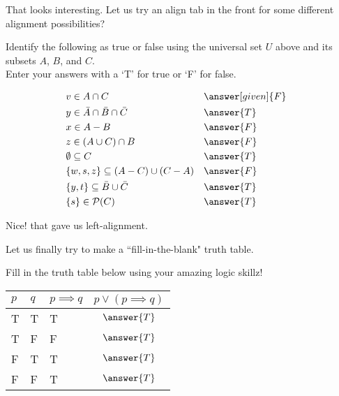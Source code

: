 \documentclass{ximera}
\begin{document}
That looks interesting. Let us try an align tab in the front for some different alignment possibilities?

\begin{question}
Identify the following as true or false using the universal set $U$ above and its subsets $A$, $B$, and $C$. \\ Enter your answers with a `T' for true or `F' for false.
\begin{prompt}

    \begin{align*}
        &v \in A \cap C && \answer[given]{F}  \\
        &y \in \bar{A} \cap \bar{B} \cap \bar{C} && \answer{T} \\		
        &x \in A - B && \answer{F}  \\		
        &z \in (A \cup C) \cap B && \answer{F} \\	
        &\emptyset \subseteq C && \answer{T} \\	
        &\{w, s, z\} \subseteq (A - C) \cup (C - A) && \answer{F}&\\
        &\{y,t\} \subseteq \bar{B} \cup \bar{C} && \answer{T} \\			
        &\{s\} \in \mathcal{P}(C) && \answer{T} 
    \end{align*}

\end{prompt}
\end{question}

Nice! that gave us left-alignment. 

Let us finally try to make a ``fill-in-the-blank" truth table.

\begin{problem}
Fill in the truth table below using your amazing logic skillz!

\begin{prompt}
\begin{center}
\begin{tabular}{p{30pt} | p{30pt} | p{60pt} | c }
		$p$ & $q$ & $p \implies q$ & $p \vee (p \implies q)$ \\
		\hline
		T & T & T & $\answer{T}$ \\
		T & F & F & $\answer{T}$ \\
		F & T & T & $\answer{T}$\\
		F & F & T & $\answer{T}$
	\end{tabular}
\end{center}
\end{prompt}
\end{problem}
\end{document}

